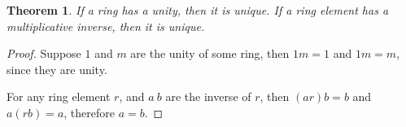 \documentclass[14pt]{extarticle}
\newtheorem{theorem}{Theorem}[section]
\newcommand{\1}{\{e\}}
\begin{document}
\begin{theorem}
  If a ring has a unity, then it is unique. 
  If a ring element has a multiplicative inverse, then it is unique.
\end{theorem}
\begin{proof}
  Suppose $1$ and $m$ are the unity of some ring,
  then $1m = 1$ and $1m = m$, since they are unity.

  For any ring element $r$, and $a \ b$ are the inverse of $r$,
  then $(ar)b = b$ and $a(rb) = a$, therefore $a = b$.
\end{proof}
\end{document}
